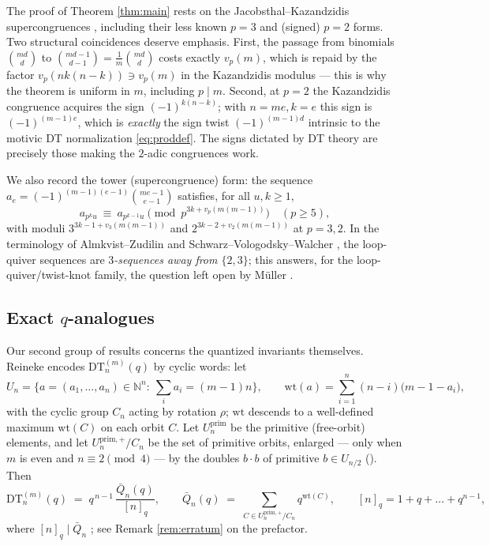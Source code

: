 \documentclass[11pt]{amsart}
\theoremstyle{definition}
\newcommand{\NN}{\mathbb{N}}
\newcommand{\DT}{\mathrm{DT}}
\newcommand{\wt}{\mathrm{wt}}
\newcommand{\prim}{\mathrm{prim}}
\newcommand{\vp}{v_p}
\begin{document}
The proof of Theorem \ref{thm:main} rests on the Jacobsthal--Kazandzidis supercongruences \cite{Kaz, RobertZuber, Mestrovic}, including their less known $p=3$ and (signed) $p=2$ forms. Two structural coincidences deserve emphasis. First, the passage from binomials $\binom{md}{d}$ to $\binom{md-1}{d-1}=\frac1m\binom{md}{d}$ costs exactly $\vp(m)$, which is repaid by the factor $\vp(nk(n-k))\ni \vp(m)$ in the Kazandzidis modulus --- this is why the theorem is uniform in $m$, including $p\mid m$. Second, at $p=2$ the Kazandzidis congruence acquires the sign $(-1)^{k(n-k)}$; with $n=me,k=e$ this sign is $(-1)^{(m-1)e}$, which is \emph{exactly} the sign twist $(-1)^{(m-1)d}$ intrinsic to the motivic DT normalization \eqref{eq:proddef}. The signs dictated by DT theory are precisely those making the $2$-adic congruences work.

We also record the tower (supercongruence) form: the sequence $a_e=(-1)^{(m-1)(e-1)}\binom{me-1}{e-1}$ satisfies, for all $u,k\ge1$,
\begin{equation}\label{eq:tower}
a_{p^k u}\ \equiv\ a_{p^{k-1}u} \pmod {p^{3k+\vp(m(m-1))}}\quad (p\ge5),
\end{equation}
with moduli $3^{3k-1+v_3(m(m-1))}$ and $2^{3k-2+v_2(m(m-1))}$ at $p=3,2$. In the terminology of Almkvist--Zudilin \cite{AZ} and Schwarz--Vologodsky--Walcher \cite{SVW}, the loop-quiver sequences are \emph{$3$-sequences away from $\{2,3\}$}; this answers, for the loop-quiver/twist-knot family, the question left open by M\"uller \cite{Muller}.

\subsection{Exact $q$-analogues}
Our second group of results concerns the quantized invariants themselves. Reineke \cite[\S6]{Rei1102} encodes $\DT^{(m)}_n(q)$ by cyclic words: let
\[
U_n=\Big\{a=(a_1,\dots,a_n)\in\NN^n:\ \textstyle\sum_i a_i=(m-1)n\Big\},\qquad
\wt(a)=\sum_{i=1}^n (n-i)\big(m-1-a_i\big),
\]
with the cyclic group $C_n$ acting by rotation $\rho$; $\wt$ descends to a well-defined maximum $\wt(C)$ on each orbit $C$. Let $U^{\prim}_n$ be the primitive (free-orbit) elements, and let $U^{\prim,+}_n/C_n$ be the set of primitive orbits, enlarged --- only when $m$ is even and $n\equiv2\pmod4$ --- by the doubles $b\cdot b$ of primitive $b\in U_{n/2}$ (\cite[\S5--6]{Rei1102}). Then
\begin{equation}\label{eq:DTword}
\DT^{(m)}_n(q)\;=\;q^{\,n-1}\,\frac{\bar Q_n(q)}{[n]_q},\qquad
\bar Q_n(q)\;=\;\sum_{C\in U^{\prim,+}_n/C_n}q^{\wt(C)},\qquad [n]_q=1+q+\dots+q^{n-1},
\end{equation}
where $[n]_q\mid\bar Q_n$ \cite[Thm.~6.7]{Rei1102}; see Remark \ref{rem:erratum} on the prefactor.
\end{document}
